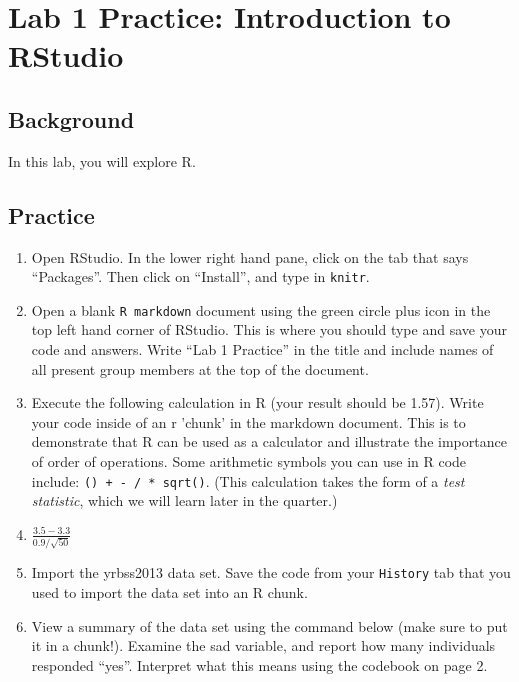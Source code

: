 \documentclass{article}\usepackage[]{graphicx}\usepackage[]{color}
\makeatletter
\newcommand{\hlstd}[1]{\textcolor[rgb]{0.345,0.345,0.345}{#1}}%
\newenvironment{kframe}{%
 \def\at@end@of@kframe{}%
 \ifinner\ifhmode%
  \def\at@end@of@kframe{\end{minipage}}%
  \begin{minipage}{\columnwidth}%
 \fi\fi%
 \def\FrameCommand##1{\hskip\@totalleftmargin \hskip-\fboxsep
 \colorbox{shadecolor}{##1}\hskip-\fboxsep
     \hskip-\linewidth \hskip-\@totalleftmargin \hskip\columnwidth}%
 \MakeFramed {\advance\hsize-\width
   \@totalleftmargin\z@ \linewidth\hsize
   \@setminipage}}%
 {\par\unskip\endMakeFramed%
 \at@end@of@kframe}
\newenvironment{knitrout}{}{} %
\makeatother
\begin{document}
\section*{Lab 1 Practice: Introduction to RStudio}

\subsection*{Background}
In this lab, you will explore R.
\subsection*{Practice}
\begin{enumerate}
\item
Open RStudio.  In the lower right hand pane, click on the tab that says ``Packages''.  Then click on ``Install'', and type in \texttt{knitr}.
\item
Open a blank \texttt{R markdown} document using the green circle plus icon in the top left hand corner of RStudio.  This is where you should type and save your code and answers. Write ``Lab 1 Practice'' in the title and include names of all present group members at the top of the document.
\item
Execute the following calculation in R (your result should be 1.57).  Write your code inside of an r 'chunk' in the markdown document.  This is to demonstrate that R can be used as a calculator and illustrate the importance of order of operations.  Some arithmetic symbols you can use in R code include: \texttt{() + - / * sqrt()}. (This calculation takes the form of a \emph{test statistic}, which we will learn later in the quarter.)
\item[]
$\displaystyle \frac{3.5-3.3}{0.9/\sqrt{50}}$
\item
Import the \hlstd{yrbss2013} data set.  Save the code from your \texttt{History} tab that you used to import the data set into an R chunk.
\item
View a summary of the data set using the command below (make sure to put it in a chunk!).  Examine the \hlstd{sad} variable, and report how many individuals responded ``yes''.  Interpret what this means using the codebook on page 2.
\begin{knitrout}
\color{fgcolor}\begin{kframe}
\begin{alltt}

\end{alltt}
\end{kframe}
\end{knitrout}
\end{enumerate}
\end{document}

